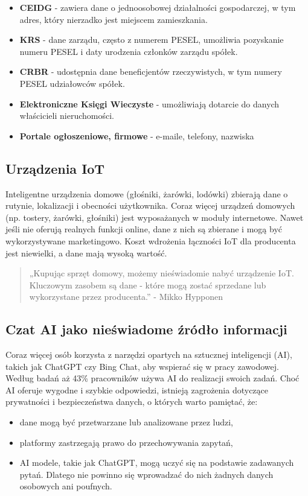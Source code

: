 \begin{itemize}
  \item \textbf{CEIDG} - zawiera dane o jednoosobowej działalności gospodarczej, w tym adres, który nierzadko jest miejscem zamieszkania. 
  \item \textbf{KRS} - dane zarządu, często z numerem PESEL, umożliwia pozyskanie numeru PESEL i daty urodzenia członków zarządu spółek.
  \item \textbf{CRBR} - udostępnia dane beneficjentów rzeczywistych, w tym numery PESEL udziałowców spółek.
  \item \textbf{Elektroniczne Księgi Wieczyste} - umożliwiają dotarcie do danych właścicieli nieruchomości.
  \item \textbf{Portale ogłoszeniowe, firmowe} - e-maile, telefony, nazwiska
\end{itemize}

\subsection{Urządzenia IoT}

Inteligentne urządzenia domowe (głośniki, żarówki, lodówki) zbierają dane o rutynie, lokalizacji i obecności użytkownika. Coraz więcej urządzeń domowych (np. tostery, żarówki, głośniki) jest wyposażanych w moduły internetowe. Nawet jeśli nie oferują realnych funkcji online, dane z nich są zbierane i mogą być wykorzystywane marketingowo. Koszt wdrożenia łączności IoT dla producenta jest niewielki, a dane mają wysoką wartość.

\begin{quote}
„Kupując sprzęt domowy, możemy nieświadomie nabyć urządzenie IoT. Kluczowym zasobem są dane - które mogą zostać sprzedane lub wykorzystane przez producenta.” - Mikko Hypponen
\end{quote}

\subsection{Czat AI jako nieświadome źródło informacji}
Coraz więcej osób korzysta z narzędzi opartych na sztucznej inteligencji (AI), takich jak ChatGPT czy Bing Chat, aby wspierać się w pracy zawodowej. Według badań aż 43\% pracowników używa AI do realizacji swoich zadań.\cite{ai} Choć AI oferuje wygodne i szybkie odpowiedzi, istnieją zagrożenia dotyczące prywatności i bezpieczeństwa danych, o których warto pamiętać, że:

\begin{itemize}
  \item dane mogą być przetwarzane lub analizowane przez ludzi,
  \item platformy zastrzegają prawo do przechowywania zapytań,
  \item AI modele, takie jak ChatGPT, mogą uczyć się na podstawie zadawanych pytań. Dlatego nie powinno się wprowadzać do nich żadnych danych osobowych ani poufnych.
\end{itemize}

